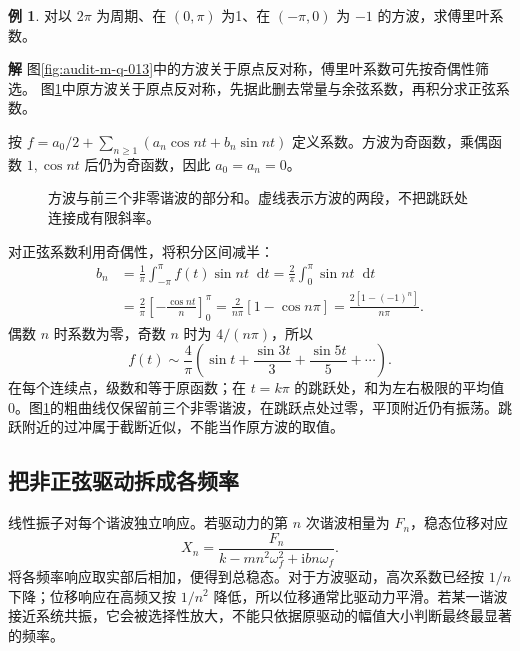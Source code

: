 \documentclass[11pt,openany,fontset=fandol]{ctexbook}
\theoremstyle{plain}\newtheorem{theorem}{定理}[chapter]\newtheorem{proposition}[theorem]{命题}
\theoremstyle{definition}\newtheorem{definition}{定义}[chapter]\newtheorem{example}{例}[chapter]
\theoremstyle{remark}\newtheorem*{remark}{说明}
\newcommand{\SolutionStart}{\par\nobreak\medskip\nobreak\noindent\textbf{解}\quad\ignorespaces}
\newenvironment{solution}{\SolutionStart}{\par\medskip}
\newcommand{\dd}{\mathop{}\!\mathrm d}\newcommand{\ii}{\mathrm i}\newcommand{\ee}{\mathrm e}
\begin{document}
\begin{example}
对以 $2\pi$ 为周期、在 $(0,\pi)$ 为1、在 $(-\pi,0)$ 为 $-1$ 的方波，求傅里叶系数。
\end{example}

\begin{solution}
图\ref{fig:audit-m-q-013}中的方波关于原点反对称，傅里叶系数可先按奇偶性筛选。
图\ref{fig:orig-010}中原方波关于原点反对称，先据此删去常量与余弦系数，再积分求正弦系数。

按 $f=a_0/2+\sum_{n\ge1}(a_n\cos nt+b_n\sin nt)$ 定义系数。方波为奇函数，乘偶函数 $1,\cos nt$ 后仍为奇函数，因此 $a_0=a_n=0$。

\begin{figure}[H]\centering
{}
\caption{方波与前三个非零谐波的部分和。虚线表示方波的两段，不把跳跃处连接成有限斜率。}
\label{fig:orig-010}
\end{figure}

对正弦系数利用奇偶性，将积分区间减半：
\begin{align*}
b_n&=\frac1\pi\int_{-\pi}^{\pi}f(t)\sin nt\dd t
=\frac2\pi\int_0^\pi\sin nt\dd t\\
&=\frac2\pi\left[-\frac{\cos nt}{n}\right]_0^\pi
=\frac2{n\pi}[1-\cos n\pi]
=\frac{2[1-(-1)^n]}{n\pi}.
\end{align*}
偶数 $n$ 时系数为零，奇数 $n$ 时为 $4/(n\pi)$，所以
\[
f(t)\sim\frac4\pi\left(\sin t+\frac{\sin3t}3+\frac{\sin5t}5+\cdots\right).
\]
在每个连续点，级数和等于原函数；在 $t=k\pi$ 的跳跃处，和为左右极限的平均值0。图\ref{fig:orig-010}的粗曲线仅保留前三个非零谐波，在跳跃点处过零，平顶附近仍有振荡。跳跃附近的过冲属于截断近似，不能当作原方波的取值。
\end{solution}

\subsection{把非正弦驱动拆成各频率}
线性振子对每个谐波独立响应。若驱动力的第 $n$ 次谐波相量为 $F_n$，稳态位移对应
\[
X_n=\frac{F_n}{k-mn^2\omega_f^2+\ii bn\omega_f}.
\]
将各频率响应取实部后相加，便得到总稳态。对于方波驱动，高次系数已经按 $1/n$ 下降；位移响应在高频又按 $1/n^2$ 降低，所以位移通常比驱动力平滑。若某一谐波接近系统共振，它会被选择性放大，不能只依据原驱动的幅值大小判断最终最显著的频率。
\end{document}
